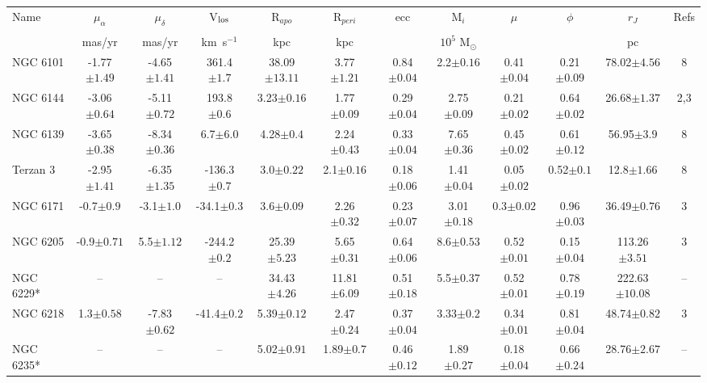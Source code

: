 \begin{landscape}
\begin{table}
\footnotesize
\begin{tabular}{lccccccccccc}
\hline
Name & $\mu_{\alpha}$ & $\mu_{\delta}$ & V$_{\rm los}$ & R$_{apo}$ & R$_{peri}$ & ecc & M$_{i}$ & $\mu$ & $\phi$ & $r_J$ & Refs \\\\
 & mas/yr & mas/yr & km$\,$ s$^{-1}$ & kpc & kpc & & $10^5$ M$_{\odot}$ & & & pc & \\
\hline
\hline
NGC 6101 & -1.77$\pm{1.49}$ & -4.65$\pm{1.41}$ & 361.4$\pm{1.7}$ & 38.09$\pm{13.11}$ & 3.77$\pm{1.21}$ & 0.84$\pm{0.04}$ & 2.2$\pm{0.16}$ & 0.41$\pm{0.04}$ & 0.21$\pm{0.09}$ & 78.02$\pm{4.56}$&8 \\ 
NGC 6144 & -3.06$\pm{0.64}$ & -5.11$\pm{0.72}$ & 193.8$\pm{0.6}$ & 3.23$\pm{0.16}$ & 1.77$\pm{0.09}$ & 0.29$\pm{0.04}$ & 2.75$\pm{0.09}$ & 0.21$\pm{0.02}$ & 0.64$\pm{0.02}$ & 26.68$\pm{1.37}$&2,3 \\ 
NGC 6139 & -3.65$\pm{0.38}$ & -8.34$\pm{0.36}$ & 6.7$\pm{6.0}$ & 4.28$\pm{0.4}$ & 2.24$\pm{0.43}$ & 0.33$\pm{0.04}$ & 7.65$\pm{0.36}$ & 0.45$\pm{0.02}$ & 0.61$\pm{0.12}$ & 56.95$\pm{3.9}$&8 \\ 
Terzan 3 & -2.95$\pm{1.41}$ & -6.35$\pm{1.35}$ & -136.3$\pm{0.7}$ & 3.0$\pm{0.22}$ & 2.1$\pm{0.16}$ & 0.18$\pm{0.06}$ & 1.41$\pm{0.04}$ & 0.05$\pm{0.02}$ & 0.52$\pm{0.1}$ & 12.8$\pm{1.66}$&8 \\ 
NGC 6171 & -0.7$\pm{0.9}$ & -3.1$\pm{1.0}$ & -34.1$\pm{0.3}$ & 3.6$\pm{0.09}$ & 2.26$\pm{0.32}$ & 0.23$\pm{0.07}$ & 3.01$\pm{0.18}$ & 0.3$\pm{0.02}$ & 0.96$\pm{0.03}$ & 36.49$\pm{0.76}$&3 \\ 
NGC 6205 & -0.9$\pm{0.71}$ & 5.5$\pm{1.12}$ & -244.2$\pm{0.2}$ & 25.39$\pm{5.23}$ & 5.65$\pm{0.31}$ & 0.64$\pm{0.06}$ & 8.6$\pm{0.53}$ & 0.52$\pm{0.01}$ & 0.15$\pm{0.04}$ & 113.26$\pm{3.51}$&3 \\ 
NGC 6229* & -- & -- & -- & 34.43$\pm{4.26}$ & 11.81$\pm{6.09}$ & 0.51$\pm{0.18}$ & 5.5$\pm{0.37}$ & 0.52$\pm{0.01}$ & 0.78$\pm{0.19}$ & 222.63$\pm{10.08}$&-- \\ 
NGC 6218 & 1.3$\pm{0.58}$ & -7.83$\pm{0.62}$ & -41.4$\pm{0.2}$ & 5.39$\pm{0.12}$ & 2.47$\pm{0.24}$ & 0.37$\pm{0.04}$ & 3.33$\pm{0.2}$ & 0.34$\pm{0.01}$ & 0.81$\pm{0.04}$ & 48.74$\pm{0.82}$&3 \\ 
NGC 6235* & -- & -- & -- & 5.02$\pm{0.91}$ & 1.89$\pm{0.7}$ & 0.46$\pm{0.12}$ & 1.89$\pm{0.27}$ & 0.18$\pm{0.04}$ & 0.66$\pm{0.24}$ & 28.76$\pm{2.67}$&-- \\ 

\end{tabular}
\end{table}
\end{landscape}
